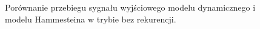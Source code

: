 \begin{figure}[p!]
\hfill
{}
\caption{Porównanie przebiegu sygnału wyjściowego modelu dynamicznego i modelu Hammesteina w trybie bez rekurencji.}
\end{figure}

